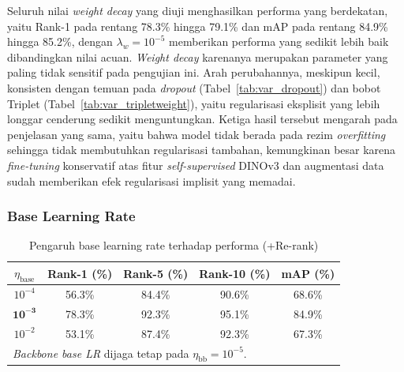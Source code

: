 Seluruh nilai \textit{weight decay} yang diuji menghasilkan performa yang berdekatan, yaitu Rank-1 pada rentang 78.3\% hingga 79.1\% dan mAP pada rentang 84.9\% hingga 85.2\%, dengan $\lambda_w=10^{-5}$ memberikan performa yang sedikit lebih baik dibandingkan nilai acuan. \textit{Weight decay} karenanya merupakan parameter yang paling tidak sensitif pada pengujian ini. Arah perubahannya, meskipun kecil, konsisten dengan temuan pada \textit{dropout} (Tabel~\ref{tab:var_dropout}) dan bobot Triplet (Tabel~\ref{tab:var_tripletweight}), yaitu regularisasi eksplisit yang lebih longgar cenderung sedikit menguntungkan. Ketiga hasil tersebut mengarah pada penjelasan yang sama, yaitu bahwa model tidak berada pada rezim \textit{overfitting} sehingga tidak membutuhkan regularisasi tambahan, kemungkinan besar karena \textit{fine-tuning} konservatif atas fitur \textit{self-supervised} DINOv3 dan augmentasi data sudah memberikan efek regularisasi implisit yang memadai.

\subsubsection{Base Learning Rate}

\begin{table}[H]
    \centering
    \caption{Pengaruh base learning rate terhadap performa (+Re-rank)}
    \label{tab:var_baselr}
    \renewcommand{\arraystretch}{1.25}
    \begin{tabular}{ccccc}
        \hline
        $\eta_{\text{base}}$ & \textbf{Rank-1 (\%)} & \textbf{Rank-5 (\%)} & \textbf{Rank-10 (\%)} & \textbf{mAP (\%)} \\
        \hline
        $10^{-4}$            & 56.3\%               & 84.4\%               & 90.6\%                & 68.6\%            \\
        $\mathbf{10^{-3}}$   & 78.3\%               & 92.3\%               & 95.1\%                & 84.9\%            \\
        $10^{-2}$            & 53.1\%               & 87.4\%               & 92.3\%                & 67.3\%            \\
        \hline
        \multicolumn{5}{l}{\footnotesize \textit{Backbone base LR} dijaga tetap pada $\eta_{\text{bb}}=10^{-5}$.}      \\
    \end{tabular}
\end{table}

